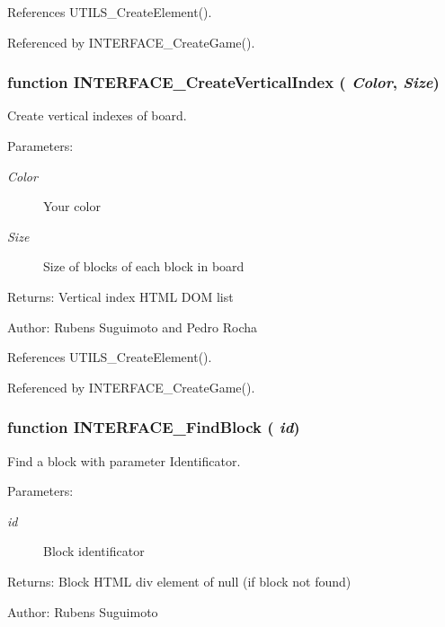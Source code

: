 References UTILS\_\-CreateElement().

Referenced by INTERFACE\_\-CreateGame().
\subsubsection[INTERFACE\_\-CreateVerticalIndex]{\setlength{\rightskip}{0pt plus 5cm}function INTERFACE\_\-CreateVerticalIndex ( {\em Color}, \/   {\em Size})}\label{board_8js_060fa6893327106724d040e9409472db}


Create vertical indexes of board. 

\begin{Desc}
\item[Parameters:]
\begin{description}
\item[{\em Color}]Your color \item[{\em Size}]Size of blocks of each block in board \end{description}
\end{Desc}
\begin{Desc}
\item[Returns:]Vertical index HTML DOM list \end{Desc}
\begin{Desc}
\item[Author:]Rubens Suguimoto and Pedro Rocha \end{Desc}


References UTILS\_\-CreateElement().

Referenced by INTERFACE\_\-CreateGame().
\subsubsection[INTERFACE\_\-FindBlock]{\setlength{\rightskip}{0pt plus 5cm}function INTERFACE\_\-FindBlock ( {\em id})}\label{board_8js_b421c25367444ac002f030dd049ddb97}


Find a block with parameter Identificator. 

\begin{Desc}
\item[Parameters:]
\begin{description}
\item[{\em id}]Block identificator \end{description}
\end{Desc}
\begin{Desc}
\item[Returns:]Block HTML div element of null (if block not found) \end{Desc}
\begin{Desc}
\item[Author:]Rubens Suguimoto \end{Desc}


